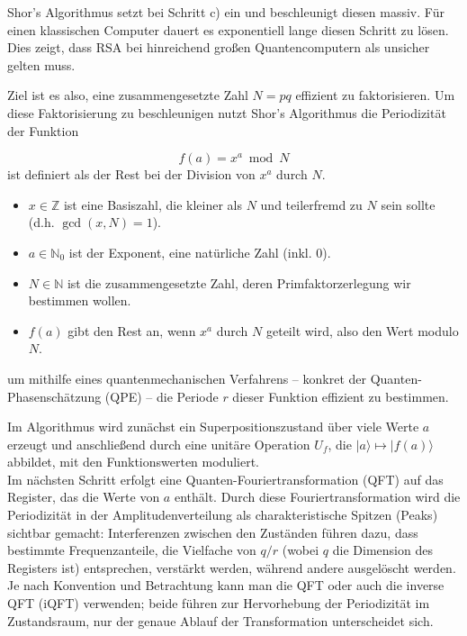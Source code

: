 Shor's Algorithmus setzt bei Schritt c) ein und beschleunigt diesen massiv. Für einen klassischen Computer dauert es exponentiell lange diesen Schritt zu lösen. Dies zeigt, dass RSA bei hinreichend großen Quantencomputern als unsicher gelten muss.

Ziel ist es also, eine zusammengesetzte Zahl \( N = pq \) effizient zu faktorisieren. Um diese Faktorisierung zu beschleunigen nutzt Shor's Algorithmus die Periodizität der Funktion

\begin{definition} 
\[
f(a) = x^a \bmod N
\]
ist definiert als der Rest bei der Division von \(x^a\) durch \(N\).

\begin{itemize}
    \item \(x \in \mathbb{Z}\) ist eine Basiszahl, die kleiner als \(N\) und teilerfremd zu \(N\) sein sollte (d.h. \(\gcd(x, N) = 1\)).
    \item \(a \in \mathbb{N}_0\) ist der Exponent, eine natürliche Zahl (inkl. 0).
    \item \(N \in \mathbb{N}\) ist die zusammengesetzte Zahl, deren Primfaktorzerlegung wir bestimmen wollen.
    \item \(f(a)\) gibt den Rest an, wenn \(x^a\) durch \(N\) geteilt wird, also den Wert modulo \(N\).
\end{itemize}
\end{definition}
um mithilfe eines quantenmechanischen Verfahrens – konkret der Quanten-Phasenschätzung (QPE) – die Periode \( r \) dieser Funktion effizient zu bestimmen.

Im Algorithmus wird zunächst ein Superpositionszustand über viele Werte \( a \) erzeugt und anschließend durch eine unitäre Operation \( U_f \), die \( |a\rangle \mapsto |f(a)\rangle \) abbildet, mit den Funktionswerten moduliert.\\

Im nächsten Schritt erfolgt eine Quanten-Fouriertransformation (QFT) auf das Register, das die Werte von \( a \) enthält. Durch diese Fouriertransformation wird die Periodizität in der Amplitudenverteilung als charakteristische Spitzen (Peaks) sichtbar gemacht: Interferenzen zwischen den Zuständen führen dazu, dass bestimmte Frequenzanteile, die Vielfache von \( q/r \) (wobei \( q \) die Dimension des Registers ist) entsprechen, verstärkt werden, während andere ausgelöscht werden.\\

Je nach Konvention und Betrachtung kann man die QFT oder auch die inverse QFT (iQFT) verwenden; beide führen zur Hervorhebung der Periodizität im Zustandsraum, nur der genaue Ablauf der Transformation unterscheidet sich.\\

